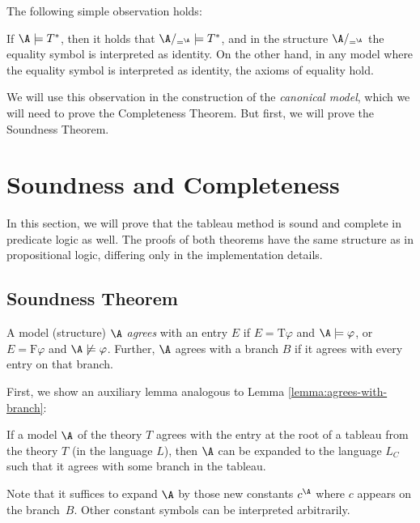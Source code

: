 The following simple observation holds:
\begin{observation}
    If $\A\models T^*$, then it holds that $\A/_{=^\A}\models T^*$, and in the structure $\A/_{=^\A}$ the equality symbol is interpreted as identity. On the other hand, in any model where the equality symbol is interpreted as identity, the axioms of equality hold.
\end{observation}

We will use this observation in the construction of the \emph{canonical model}, which we will need to prove the Completeness Theorem. But first, we will prove the Soundness Theorem.

\section{Soundness and Completeness}

In this section, we will prove that the tableau method is sound and complete in predicate logic as well. The proofs of both theorems have the same structure as in propositional logic, differing only in the implementation details.

\subsection{Soundness Theorem}

A model (structure) $\A$ \emph{agrees} with an entry $E$ if
$E=\mathrm{T}\varphi$ and $\A\models\varphi$, or $E=\mathrm{F}\varphi$ and $\A\not\models\varphi$. Further, $\A$ agrees with a branch $B$ if it agrees with every entry on that branch.

First, we show an auxiliary lemma analogous to Lemma \ref{lemma:agrees-with-branch}:
\begin{lemma}\label{lemma:agrees-with-branch-predicate}
    If a model $\A$ of the theory $T$ agrees with the entry at the root of a tableau from the theory $T$ (in the language $L$), then $\A$ can be expanded to the language $L_C$ such that it agrees with some branch in the tableau.
\end{lemma}
Note that it suffices to expand $\A$ by those new constants $c^\A$ where $c$ appears on the branch~$B$. Other constant symbols can be interpreted arbitrarily.

